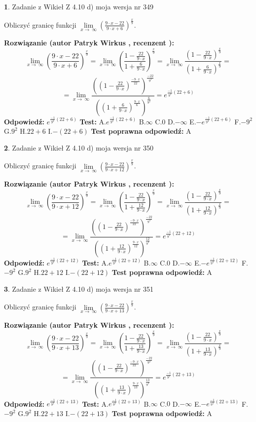 \documentclass[12pt, a4paper]{article}
\theoremstyle{definition} %
\newtheorem{zad}{}
\newcommand{\zadStart}[1]{\begin{zad}#1\newline}
\newcommand{\zadStop}{\end{zad}}
\newcommand{\rozwStart}[2]{\noindent \textbf{Rozwiązanie (autor #1 , recenzent #2): }\newline}
\newcommand{\rozwStop}{\newline}
\newcommand{\odpStart}{\noindent \textbf{Odpowiedź:}\newline}
\newcommand{\odpStop}{\newline}
\newcommand{\testStart}{\noindent \textbf{Test:}\newline}
\newcommand{\testStop}{\newline}
\newcommand{\kluczStart}{\noindent \textbf{Test poprawna odpowiedź:}\newline}
\newcommand{\kluczStop}{\newline}
\begin{document}
\zadStart{Zadanie z Wikieł Z 4.10 d) moja wersja nr 349}


Obliczyć granicę funkcji  $\lim\limits_{x\to\ \infty}(\frac{9\cdot x-22}{9\cdot x+6})^{\frac{x}{9}}$.
\zadStop
\rozwStart{Patryk Wirkus}{}
$$\lim\limits_{x\to\ \infty}(\frac{9\cdot x-22}{9\cdot x+6})^{\frac{x}{9}} = \lim\limits_{x\to\ \infty}(\frac{1-\frac{22}{9\cdot x}}{1+\frac{6}{9\cdot x}})^{\frac{x}{9}}=\lim\limits_{x\to\ \infty}\frac{(1-\frac{22}{9\cdot x})^{\frac{x}{9}}}{(1+\frac{6}{9\cdot x})^{\frac{x}{9}}}=$$
$$=\lim\limits_{x\to\ \infty}\frac{((1-\frac{22}{9\cdot x})^{\frac{-9\cdot x}{22}})^{\frac{-22}{9^{2}}}}{((1+\frac{6}{9\cdot x})^{\frac{9\cdot x}{6}})^{\frac{6}{9^{2}}}}=e^{\frac{-1}{9^{2}}(22+6)}$$
\rozwStop
\odpStart
$e^{\frac{-1}{9^{2}}(22+6)}$
\odpStop
\testStart
A.$e^{\frac{-1}{9^{2}}(22+6)}$ B.$\infty$ C.$0$ D.$-\infty$ E.$-e^{\frac{-1}{9^{2}}(22+6)}$
F.$-9^{2}$ G.$9^{2}$
H.$22+6$
I.$-(22+6)$
\testStop
\kluczStart
A
\kluczStop



\zadStart{Zadanie z Wikieł Z 4.10 d) moja wersja nr 350}


Obliczyć granicę funkcji  $\lim\limits_{x\to\ \infty}(\frac{9\cdot x-22}{9\cdot x+12})^{\frac{x}{9}}$.
\zadStop
\rozwStart{Patryk Wirkus}{}
$$\lim\limits_{x\to\ \infty}(\frac{9\cdot x-22}{9\cdot x+12})^{\frac{x}{9}} = \lim\limits_{x\to\ \infty}(\frac{1-\frac{22}{9\cdot x}}{1+\frac{12}{9\cdot x}})^{\frac{x}{9}}=\lim\limits_{x\to\ \infty}\frac{(1-\frac{22}{9\cdot x})^{\frac{x}{9}}}{(1+\frac{12}{9\cdot x})^{\frac{x}{9}}}=$$
$$=\lim\limits_{x\to\ \infty}\frac{((1-\frac{22}{9\cdot x})^{\frac{-9\cdot x}{22}})^{\frac{-22}{9^{2}}}}{((1+\frac{12}{9\cdot x})^{\frac{9\cdot x}{12}})^{\frac{12}{9^{2}}}}=e^{\frac{-1}{9^{2}}(22+12)}$$
\rozwStop
\odpStart
$e^{\frac{-1}{9^{2}}(22+12)}$
\odpStop
\testStart
A.$e^{\frac{-1}{9^{2}}(22+12)}$ B.$\infty$ C.$0$ D.$-\infty$ E.$-e^{\frac{-1}{9^{2}}(22+12)}$
F.$-9^{2}$ G.$9^{2}$
H.$22+12$
I.$-(22+12)$
\testStop
\kluczStart
A
\kluczStop



\zadStart{Zadanie z Wikieł Z 4.10 d) moja wersja nr 351}


Obliczyć granicę funkcji  $\lim\limits_{x\to\ \infty}(\frac{9\cdot x-22}{9\cdot x+13})^{\frac{x}{9}}$.
\zadStop
\rozwStart{Patryk Wirkus}{}
$$\lim\limits_{x\to\ \infty}(\frac{9\cdot x-22}{9\cdot x+13})^{\frac{x}{9}} = \lim\limits_{x\to\ \infty}(\frac{1-\frac{22}{9\cdot x}}{1+\frac{13}{9\cdot x}})^{\frac{x}{9}}=\lim\limits_{x\to\ \infty}\frac{(1-\frac{22}{9\cdot x})^{\frac{x}{9}}}{(1+\frac{13}{9\cdot x})^{\frac{x}{9}}}=$$
$$=\lim\limits_{x\to\ \infty}\frac{((1-\frac{22}{9\cdot x})^{\frac{-9\cdot x}{22}})^{\frac{-22}{9^{2}}}}{((1+\frac{13}{9\cdot x})^{\frac{9\cdot x}{13}})^{\frac{13}{9^{2}}}}=e^{\frac{-1}{9^{2}}(22+13)}$$
\rozwStop
\odpStart
$e^{\frac{-1}{9^{2}}(22+13)}$
\odpStop
\testStart
A.$e^{\frac{-1}{9^{2}}(22+13)}$ B.$\infty$ C.$0$ D.$-\infty$ E.$-e^{\frac{-1}{9^{2}}(22+13)}$
F.$-9^{2}$ G.$9^{2}$
H.$22+13$
I.$-(22+13)$
\testStop
\kluczStart
A
\kluczStop
\end{document}
